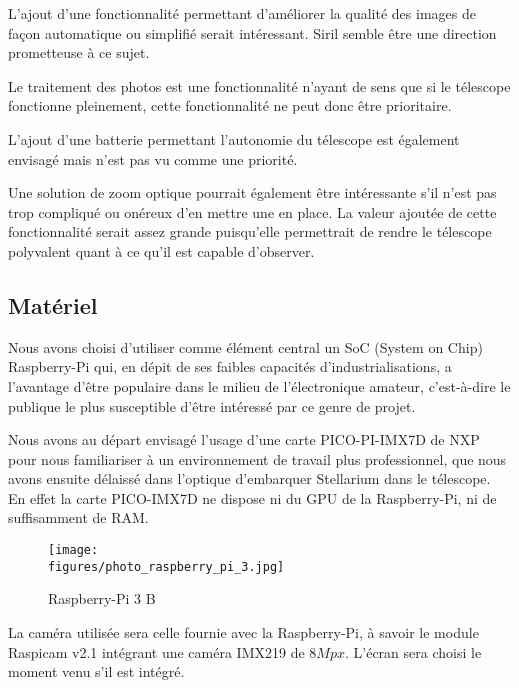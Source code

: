 \vspace{1cm}

L'ajout d'une fonctionnalité permettant d'améliorer la qualité des images de façon automatique ou simplifié serait intéressant. Siril semble être une direction prometteuse à ce sujet.

Le traitement des photos est une fonctionnalité n'ayant de sens que si le télescope fonctionne pleinement, cette fonctionnalité ne peut donc être prioritaire.

\vspace{1cm}

L'ajout d'une batterie permettant l'autonomie du télescope est également envisagé mais n'est pas vu comme une priorité.

\vspace{1cm}

Une solution de zoom optique pourrait également être intéressante s'il n'est pas trop compliqué ou onéreux d'en mettre une en place. La valeur ajoutée de cette fonctionnalité serait assez grande puisqu'elle permettrait de rendre le télescope polyvalent quant à ce qu'il est capable d'observer.

\subsection{Matériel}

Nous avons choisi d'utiliser comme élément central un SoC (System on Chip) Raspberry-Pi qui, en dépit de ses faibles capacités d'industrialisations, a l'avantage d'être populaire dans le milieu de l'électronique amateur, c'est-à-dire le publique le plus susceptible d'être intéressé par ce genre de projet.

Nous avons au départ envisagé l'usage d'une carte PICO-PI-IMX7D de NXP pour nous familiariser à un environnement de travail plus professionnel, que nous avons ensuite délaissé dans l'optique d'embarquer Stellarium dans le télescope. En effet la carte PICO-IMX7D ne dispose ni du GPU de la Raspberry-Pi, ni de suffisamment de RAM.

\begin{figure}[H]
    \centering
    \texttt{[image: \\figures/photo\_raspberry\_pi\_3.jpg]}
    \decoRule
    \caption[
    Raspberry-Pi 3 B]{
    Raspberry-Pi 3 B}
    \label{fig:Raspberry-Pi 3 B}
    \end{figure}

\vspace{1cm}

La caméra utilisée sera celle fournie avec la Raspberry-Pi, à savoir le module Raspicam v2.1 intégrant une caméra IMX219 de $8Mpx$. L'écran sera choisi le moment venu s'il est intégré.

